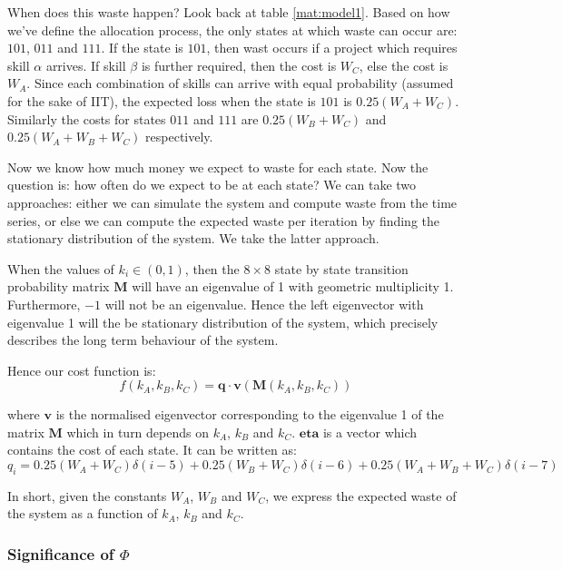 When does this waste happen? Look back at table \ref{mat:model1}. Based on how we've define the allocation process, the only states at which waste can occur are: $101$, $011$ and $111$. If the state is $101$, then wast occurs if a project which requires skill $\alpha$ arrives. If skill $\beta$ is further required, then the cost is $W_C$, else the cost is $W_A$. Since each combination of skills can arrive with equal probability (assumed for the sake of IIT), the expected loss when the state is $101$ is $0.25(W_A+W_C)$.
Similarly the costs for states $011$ and $111$ are $0.25(W_B+W_C)$ and $0.25(W_A+W_B+W_C)$ respectively.

Now we know how much money we expect to waste for each state. Now the question is: how often do we expect to be at each state? We can take two approaches: either we can simulate the system and compute waste from the time series, or else we can compute the expected waste per iteration by finding the stationary distribution of the system. We take the latter approach.

When the values of $k_i \in (0,1)$, then the $8\times8$ state by state transition probability matrix $\mathbf{M}$ will have an eigenvalue of 1 with geometric multiplicity 1. Furthermore, $-1$ will not be an eigenvalue. Hence the left eigenvector with eigenvalue 1 will the be stationary distribution of the system, which precisely describes the long term behaviour of the system. 

Hence our cost function is:
\begin{equation}
\label{eq:simple_model_cost_function}
f(k_A, k_B, k_C) = \mathbf{q} \cdot \mathbf{v}(\mathbf{M}(k_A, k_B, k_C))
\end{equation}

where $\mathbf{v}$ is the normalised eigenvector corresponding to the eigenvalue 1 of the matrix $\mathbf{M}$ which in turn depends on $k_A$, $k_B$ and $k_C$. $\mathbf{eta}$ is a vector which contains the cost of each state. It can be written as: 
\begin{equation}
q_i = 0.25(W_A+W_C)\delta(i-5) + 0.25(W_B+W_C)\delta(i-6) + 0.25(W_A+W_B+W_C)\delta(i-7)
\end{equation}

In short, given the constants $W_A$, $W_B$ and $W_C$, we express the expected waste of the system as a function of $k_A$, $k_B$ and $k_C$. 

\subsubsection{Significance of $\Phi$}

